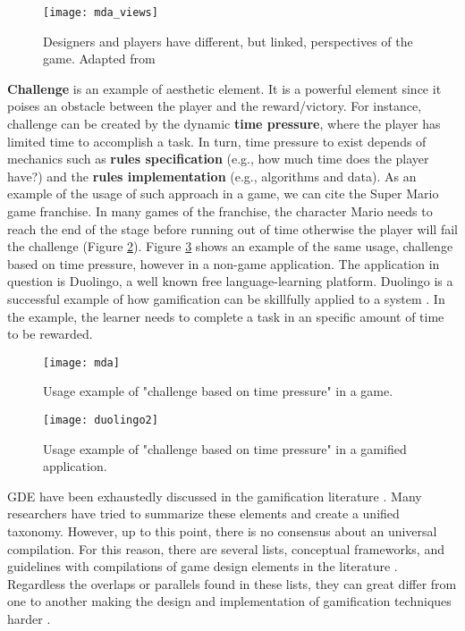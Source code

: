 \begin{figure}[h!]
\caption{Designers and players have different, but linked, perspectives of the game. Adapted from \cite{hunicke2004}}
\centering
\texttt{[image: mda\_views]}
\label{fig:mda_views}
\end{figure}

\textbf{Challenge} is an example of aesthetic element. 
It is a powerful element since it poises an obstacle between the player and the reward/victory. 
For instance, challenge can be created by the dynamic \textbf{time pressure}, where the player has limited time to accomplish a task. 
In turn, time pressure to exist depends of mechanics such as \textbf{rules specification} (e.g., how much time does the player have?) and the \textbf{rules implementation} (e.g., algorithms and data). 
As an example of the usage of such approach in a game, we can cite the Super Mario game franchise. In many games of the franchise, the character Mario needs to reach the end of the stage before running out of time otherwise the player will fail the challenge (Figure \ref{fig:mda}). Figure \ref{fig:duolingo} shows an example of the same usage, challenge based on time pressure, however in a non-game application. The application in question is Duolingo, a well known free language-learning platform. Duolingo is a successful example of how gamification can be skillfully applied to a system \cite{Huynh2016}. In the example, the learner needs to complete a task in an specific amount of time to be rewarded. 


\begin{figure}[h!]
\caption{Usage example of "challenge based on time pressure" in a game.}
\centering
\texttt{[image: mda]}
\label{fig:mda}
\end{figure}

\begin{figure}[h!]
\caption{Usage example of "challenge based on time pressure" in a gamified application.}
\centering
\texttt{[image: duolingo2]}
\label{fig:duolingo}
\end{figure}

GDE have been exhaustedly discussed in the gamification literature \cite{kapp2012gamification,robinson2013preliminary,werbach2012win,zichermann2010game,zichermann2011gamification,Ferro2013}.
Many researchers have tried to summarize these elements and create a unified taxonomy. However, up to this point, there is no consensus about an universal compilation. 
For this reason, 
there are several lists, conceptual frameworks, and guidelines with compilations of game design elements in the literature \cite{Ferro2013,A_Link_Between_Worlds}. 
Regardless the overlaps or parallels found in these lists, 
they can great differ from one to another making the design and implementation of gamification techniques harder \cite{Sailer2017}.

